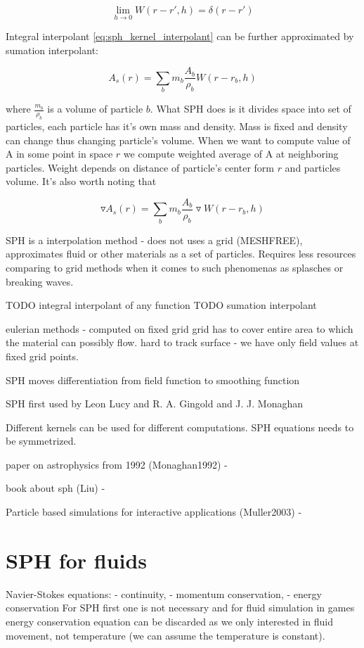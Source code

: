 \begin{equation}
\label{eq:sph_kernel_property_2}
\lim_{h \to 0}W(r - r', h) = \delta(r-r')
\end{equation}

Integral interpolant \ref{eq:sph_kernel_interpolant} can be further approximated by sumation interpolant:

\begin{equation}
\label{eq:sumation_interpolant}
A_s(r) = \sum_{b}m_b\frac{A_b}{\rho_b}W(r-r_b,h)
\end{equation}

where $\frac{m_b}{\rho_b}$ is a volume of particle $b$. What SPH does is it divides space into set of particles, each particle has it's own mass and density. Mass is fixed and density can change thus changing particle's volume. When we want to compute value of A in some point in space $r$ we compute weighted average of A at neighboring particles. Weight depends on distance of particle's center form $r$ and particles volume. 
It's also worth noting that 

\begin{equation}
\label{eq:sumation_interpolant_gradient}
\triangledown A_s(r) = \sum_{b}m_b\frac{A_b}{\rho_b}\triangledown W(r-r_b,h) 
\end{equation}

SPH is a interpolation method - does not uses a grid (MESHFREE), approximates fluid or other materials as a set of particles. Requires less resources comparing to grid methods when it comes to such phenomenas as splasches or breaking waves. 

TODO integral interpolant of any function
TODO sumation interpolant

eulerian methods - computed on fixed grid
	grid has to cover entire area to which the material can possibly flow. 
	hard to track surface - we have only field values at fixed grid points. 

SPH moves differentiation from field function to smoothing function

SPH first used by Leon Lucy and R. A. Gingold and J. J. Monaghan

Different kernels can be used for different computations.
SPH equations needs to be symmetrized.

paper on astrophysics from 1992 (Monaghan1992) - \cite{Monaghan1992}

book about sph (Liu) - \cite{Liu}

Particle based simulations for interactive applications (Muller2003) - \cite{Muller2003}

\section{SPH for fluids}

Navier-Stokes equations: 
 - continuity, 
 - momentum conservation, 
 - energy conservation
For SPH first one is not necessary and for fluid simulation in games energy conservation equation can be discarded as we only interested in fluid movement, not temperature (we can assume the temperature is constant). 